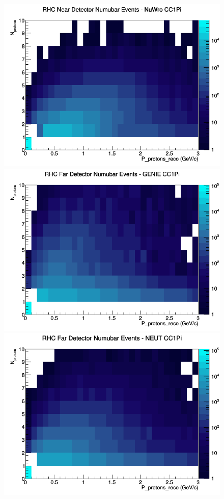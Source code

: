 \documentclass[12pt]{article}
\begin{document}
\begin{figure}[h]
\includegraphics[width=\linewidth]{eff_N_P/FGT/protons/CC1Pi_RHC_ND_numubar_N_P_NuWro.png}
\endminipage
\newline
{}
\includegraphics[width=\linewidth]{eff_N_P/FGT/protons/CC1Pi_RHC_FD_numubar_N_P_GENIE.png}
\endminipage
{}
\includegraphics[width=\linewidth]{eff_N_P/FGT/protons/CC1Pi_RHC_FD_numubar_N_P_NEUT.png}

\end{figure}
\end{document}
